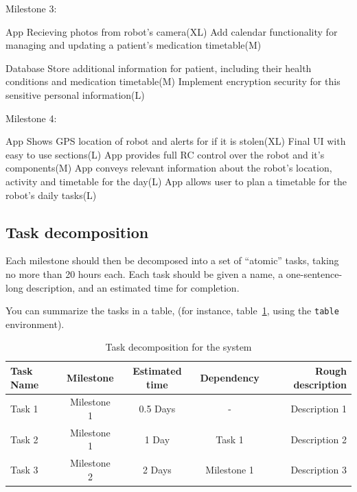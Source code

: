 \documentclass{article}
\begin{document}
Milestone 3:

App
    Recieving photos from robot's camera(XL)
    Add calendar functionality for managing and updating a patient's medication timetable(M)

Database
    Store additional information for patient, including their health conditions and medication timetable(M)
    Implement encryption security for this sensitive personal information(L)

Milestone 4:

App
    Shows GPS location of robot and alerts for if it is stolen(XL)
    Final UI with easy to use sections(L)
    App provides full RC control over the robot and it's components(M)
    App conveys relevant information about the robot's location, activity and timetable for the day(L)
    App allows user to plan a timetable for the robot's daily tasks(L)
   
    




\subsection{Task decomposition} 
Each milestone should then be decomposed into a set of ``atomic'' tasks, taking no more than 20 hours each. Each task should be given a name, a one-sentence-long description, and an estimated time for completion.


You can summarize the tasks in a table, (for instance, table~\ref{tab:sample-table}, using the \verb+table+ environment).

\begin{table}[h]
\vskip 3mm
\begin{center}
\begin{small}
\begin{sc}
\begin{tabular}{lcccr}
\hline
\abovespace\belowspace
Task Name & Milestone  & Estimated time & Dependency &  Rough description \\
\hline
\abovespace
Task 1 & Milestone 1    & 0.5 Days & - & Description 1 \\
Task 2 & Milestone 1    & 1 Day  & Task 1 & Description 2 \\
Task 3 & Milestone 2    & 2 Days & Milestone 1 & Description 3 
\belowspace
\end{tabular}
\end{sc}
\end{small}
\caption{Task decomposition for the system}
\label{tab:sample-table}
\end{center}
\vskip -3mm
\end{table}
\end{document}
